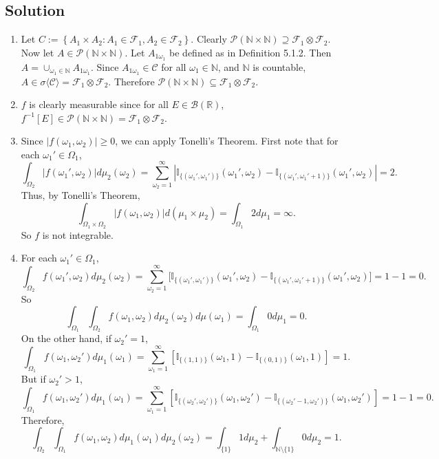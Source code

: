 \documentclass[12pt]{article}
\begin{document}
\subsection*{Solution}
\begin{enumerate}[label=(\roman*)]
\item Let $C := \left\{ A_{1} \times A_{2} : A_{1} \in \mathcal{F}_{1}, A_{2} \in \mathcal{F}_{2} \right\}$. 
Clearly $\mathcal{P}(\mathbb{N} \times \mathbb{N}) \supseteq \mathcal{F}_{1} \otimes \mathcal{F}_{2}$. Now let $A \in \mathcal{P}(\mathbb{N}
\times \mathbb{N})$. Let $A_{1\omega_{1}}$ be defined as in Definition 5.1.2. Then $A = \cup_{\omega_{1} \in \mathbb{N}}A_{1\omega_{1}}$. Since
$A_{1\omega_{1}} \in \mathcal{C}$ for all $\omega_{1} \in \mathbb{N}$, and $\mathbb{N}$ is countable, $A \in \sigma\langle\mathcal{C}\rangle =
\mathcal{F}_{1} \otimes \mathcal{F}_{2}$. Therefore $\mathcal{P}(\mathbb{N} \times \mathbb{N}) \subseteq \mathcal{F}_{1} \otimes \mathcal{F}_{2}$.

\item $f$ is clearly measurable since for all $E \in \mathcal{B}(\mathbb{R})$, $f^{-1}[E] \in \mathcal{P}(\mathbb{N} \times \mathbb{N}) =
\mathcal{F}_{1} \otimes \mathcal{F}_{2}$.

\item Since $|f(\omega_{1}, \omega_{2})| \geq 0$, we can apply Tonelli's Theorem. First note that for each $\omega_{1}' \in \Omega_{1}$,
\[ \int_{\Omega_{2}}|f(\omega_{1}', \omega_{2})|d\mu_{2}(\omega_{2}) = \sum_{\omega_{2}=1}^{\infty}|\mathbb{I}_{\{(\omega_{1}',
\omega_{1}')\}}(\omega_{1}', \omega_{2}) - \mathbb{I}_{\{(\omega_{1}', \omega_{1}' + 1)\}}(\omega_{1}', \omega_{2})| = 2. \]
Thus, by Tonelli's Theorem,
\[ \int_{\Omega_{1}\times \Omega_{2}}|f(\omega_{1}, \omega_{2})|d(\mu_{1}\times\mu_{2}) = \int_{\Omega_{1}}2 d\mu_{1} = \infty. \]
So $f$ is not integrable.

\item For each $\omega_{1}' \in \Omega_{1}$,
\[ \int_{\Omega_{2}}f(\omega_{1}', \omega_{2})d\mu_{2}(\omega_{2}) = \sum_{\omega_{2}=1}^{\infty}\big[\mathbb{I}_{\{(\omega_{1}',
\omega_{1}')\}}(\omega_{1}', \omega_{2}) - \mathbb{I}_{\{(\omega_{1}', \omega_{1}' + 1)\}}(\omega_{1}', \omega_{2})\big] = 1 - 1 = 0. \]
So 
\[ \int_{\Omega_{1}}\int_{\Omega_{2}}f(\omega_{1},\omega_{2})d\mu_{2}(\omega_{2})d\mu(\omega_{1}) = \int_{\Omega_{1}}0d\mu_{1} = 0. \]
On the other hand, if $\omega_{2}' = 1$,
\[ \int_{\Omega_{1}}f(\omega_{1}, \omega_{2}')d\mu_{1}(\omega_{1}) = \sum_{\omega_{1} = 1}^{\infty}\left[\mathbb{I}_{\{(1,1)\}}(\omega_{1}, 1) -
\mathbb{I}_{\{(0,1)\}}(\omega_{1}, 1)\right] = 1. \]
But if $\omega_{2}' > 1$,
\[ \int_{\Omega_{1}}f(\omega_{1}, \omega_{2}')d\mu_{1}(\omega_{1}) = \sum_{\omega_{1} = 1}^{\infty}\left[\mathbb{I}_{\{(\omega_{2}',\omega_{2}')\}}(\omega_{1},
\omega_{2}') - \mathbb{I}_{\{(\omega_{2}' - 1, \omega_{2}')\}}(\omega_{1}, \omega_{2}')\right] = 1 - 1 = 0. \]
Therefore, 
\[ \int_{\Omega_{2}}\int_{\Omega_{1}}f(\omega_{1},\omega_{2})d\mu_{1}(\omega_{1})d\mu_{2}(\omega_{2}) = \int_{\{1\}}1d\mu_{2} +
\int_{\mathbb{N}\setminus \{1\}}0d\mu_{2} = 1. \]
\end{enumerate}
\end{document}
